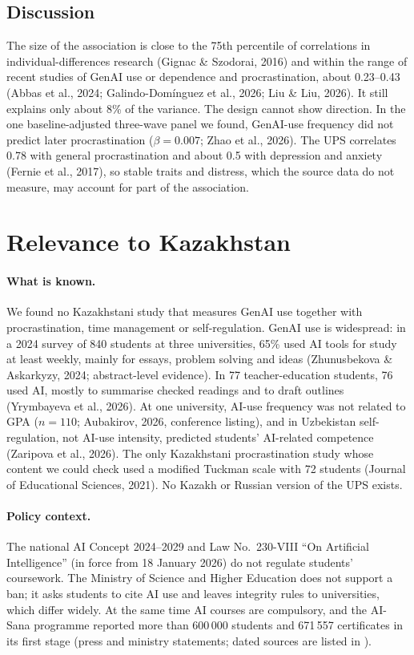 \documentclass[11pt,a4paper]{article}
\begin{document}
\subsection{Discussion}
The size of the association is close to the 75th percentile of correlations in individual-differences research (Gignac \& Szodorai, 2016) and within the range of recent studies of GenAI use or dependence and procrastination, about 0.23--0.43 (Abbas et al., 2024; Galindo-Dom\'inguez et al., 2026; Liu \& Liu, 2026). It still explains only about 8\% of the variance. The design cannot show direction. In the one baseline-adjusted three-wave panel we found, GenAI-use frequency did not predict later procrastination ($\beta=0.007$; Zhao et al., 2026). The UPS correlates 0.78 with general procrastination and about 0.5 with depression and anxiety (Fernie et al., 2017), so stable traits and distress, which the source data do not measure, may account for part of the association.

\section{Relevance to Kazakhstan}
\label{sec:kz}
\paragraph{What is known.} We found no Kazakhstani study that measures GenAI use together with procrastination, time management or self-regulation. GenAI use is widespread: in a 2024 survey of 840 students at three universities, 65\% used AI tools for study at least weekly, mainly for essays, problem solving and ideas (Zhunusbekova \& Askarkyzy, 2024; abstract-level evidence). In 77 teacher-education students, 76 used AI, mostly to summarise checked readings and to draft outlines (Yrymbayeva et al., 2026). At one university, AI-use frequency was not related to GPA ($n=110$; Aubakirov, 2026, conference listing), and in Uzbekistan self-regulation, not AI-use intensity, predicted students' AI-related competence (Zaripova et al., 2026). The only Kazakhstani procrastination study whose content we could check used a modified Tuckman scale with 72 students (Journal of Educational Sciences, 2021). No Kazakh or Russian version of the UPS exists.

\paragraph{Policy context.} The national AI Concept 2024--2029 and Law No.~230-VIII ``On Artificial Intelligence'' (in force from 18 January 2026) do not regulate students' coursework. The Ministry of Science and Higher Education does not support a ban; it asks students to cite AI use and leaves integrity rules to universities, which differ widely. At the same time AI courses are compulsory, and the AI-Sana programme reported more than 600\,000 students and 671\,557 certificates in its first stage (press and ministry statements; dated sources are listed in ).
\end{document}
